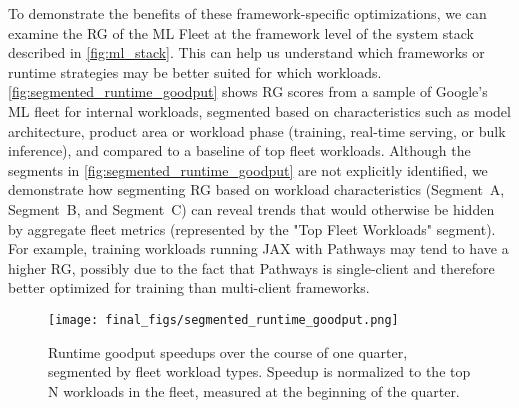 To demonstrate the benefits of these framework-specific optimizations, we can examine the RG of the ML Fleet at the framework level of the system stack described in \autoref{fig:ml_stack}. This can help us understand which frameworks or runtime strategies may be better suited for which workloads.
\autoref{fig:segmented_runtime_goodput} shows RG scores from a sample of Google's ML fleet for internal workloads, segmented based on characteristics such as model architecture, product area or workload phase (training, real-time serving, or bulk inference), and compared to a baseline of top fleet workloads. Although the segments in \autoref{fig:segmented_runtime_goodput} are not explicitly identified, we demonstrate how segmenting RG based on workload characteristics (Segment~A, Segment~B, and Segment~C) can reveal trends that would otherwise be hidden by aggregate fleet metrics (represented by the "Top Fleet Workloads" segment). For example, training workloads running JAX with Pathways may tend to have a higher RG, possibly due to the fact that Pathways is single-client \cite{barham2022pathways} and therefore better optimized for training than multi-client frameworks.

\begin{figure}[t]
    \centering
    \texttt{[image: final\_figs/segmented\_runtime\_goodput.png]}
    \caption{Runtime goodput speedups over the course of one quarter, segmented by fleet workload types. Speedup is normalized to the top N workloads in the fleet, measured at the beginning of the quarter. }
    \label{fig:segmented_runtime_goodput}
\end{figure}

